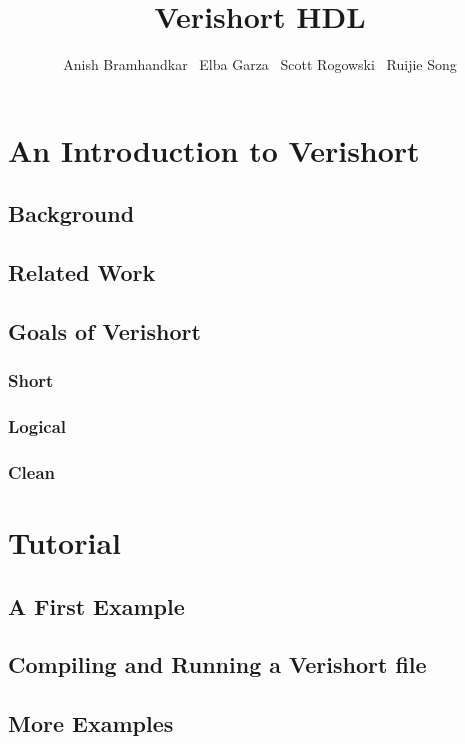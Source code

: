 \documentclass[letterpaper,12pt]{article}
\begin{document}
\title{Verishort HDL}
\author{Anish Bramhandkar \ Elba Garza \ Scott Rogowski \ Ruijie Song}
\renewcommand{\today}{December 22, 2010}
\maketitle

\newpage

\tableofcontents

\newpage

\section{An Introduction to Verishort}
    \subsection{Background}

    \subsection{Related Work}
        \subsection{Goals of Verishort}
        \subsubsection{Short}
        \subsubsection{Logical}
        \subsubsection{Clean}


\section{Tutorial}
    \subsection{A First Example}
    \subsection{Compiling and Running a Verishort file}
    \subsection{More Examples}
\end{document}
